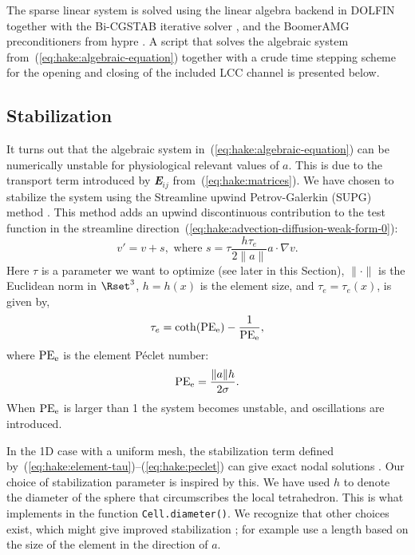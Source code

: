 The sparse linear system is solved using the \petsc linear algebra
backend \citep{BalayBuschelmanGroppEtAl2001} in DOLFIN together with
the Bi-CGSTAB iterative solver \citep{Vorst1992}, and the BoomerAMG
preconditioners from hypre \citep{FalgoutYang2002}. A script that
solves the algebraic system from~(\ref{eq:hake:algebraic-equation})
together with a crude time stepping scheme for the opening and closing
of the included LCC channel is presented below.

\subsection{Stabilization}
\label{sec:hake:stabilization}

It turns out that the algebraic system
in~(\ref{eq:hake:algebraic-equation}) can be numerically unstable for
physiological relevant values of $a$. This is due to the transport
term introduced by {\bfseries\itshape E}$_{ij}$
from~(\ref{eq:hake:matrices}). We have chosen to stabilize the system
using the Streamline upwind Petrov-Galerkin (SUPG) method
\citep{BrooksHughes1982}. This method adds an upwind discontinuous
contribution to the test function in the streamline
direction~(\ref{eq:hake:advection-diffusion-weak-form-0}):
\begin{equation}
  \label{eq:hake:stabilizing-term}
  v' = v+s, \text{ where } s = \tau\frac{h\tau_e}{2\|a\|}a\cdot\nabla v.
\end{equation}
Here $\tau$ is a parameter we want to optimize (see later in this
Section), $\|\cdot\|$ is the Euclidean norm in $\Rset^3$, $h=h(x)$ is
the element size, and $\tau_e=\tau_e(x)$, is given by,
\begin{equation}
  \label{eq:hake:element-tau}
  \tau_e=\coth(\mathrm{PE}_{\mathrm{e}})-\frac{1}{\mathrm{PE}_{\mathrm{e}}},
\end{equation}
where $\mathrm{PE}_{\mathrm{e}}$ is the element P\'eclet number:
\begin{equation}
  \label{eq:hake:peclet}
  \mathrm{PE}_{\mathrm{e}} = \frac{\|a\|h}{2\sigma}.
\end{equation}
When $\mathrm{PE}_{\mathrm{e}}$ is larger than 1 the system becomes unstable, and
oscillations are introduced.

In the 1D case with a uniform mesh, the stabilization term defined
by~(\ref{eq:hake:element-tau})--(\ref{eq:hake:peclet}) can give exact
nodal solutions
\citep{ChristieGriffithsMitchellEtAl1976,BrooksHughes1982}. Our choice
of stabilization parameter is inspired by this.  We have used $h$ to
denote the diameter of the sphere that circumscribes the local
tetrahedron.  This is what \dolfin implements in the function
\texttt{Cell.diameter()}. We recognize that other choices exist, which
might give improved stabilization \citep{JohnKnobloch2007}; for
example \citet{TezduyarPark1986} use a length based on the size of the
element in the direction of $a$.


